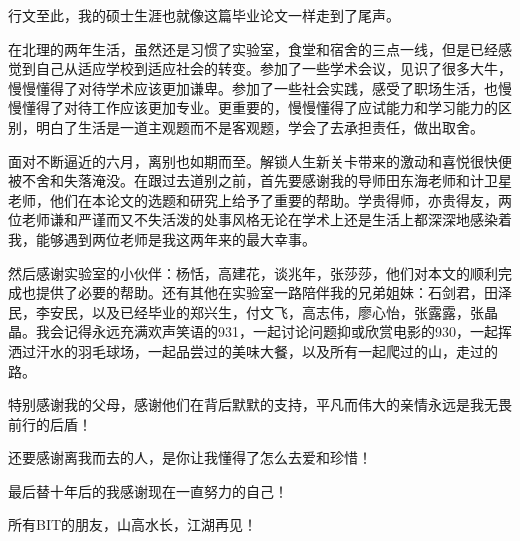 
\begin{thanks}
行文至此，我的硕士生涯也就像这篇毕业论文一样走到了尾声。

在北理的两年生活，虽然还是习惯了实验室，食堂和宿舍的三点一线，但是已经感觉到自己从适应学校到适应社会的转变。参加了一些学术会议，见识了很多大牛，慢慢懂得了对待学术应该更加谦卑。参加了一些社会实践，感受了职场生活，也慢慢懂得了对待工作应该更加专业。更重要的，慢慢懂得了应试能力和学习能力的区别，明白了生活是一道主观题而不是客观题，学会了去承担责任，做出取舍。

面对不断逼近的六月，离别也如期而至。解锁人生新关卡带来的激动和喜悦很快便被不舍和失落淹没。在跟过去道别之前，首先要感谢我的导师田东海老师和计卫星老师，他们在本论文的选题和研究上给予了重要的帮助。学贵得师，亦贵得友，两位老师谦和严谨而又不失活泼的处事风格无论在学术上还是生活上都深深地感染着我，能够遇到两位老师是我这两年来的最大幸事。

然后感谢实验室的小伙伴：杨恬，高建花，谈兆年，张莎莎，他们对本文的顺利完成也提供了必要的帮助。还有其他在实验室一路陪伴我的兄弟姐妹：石剑君，田泽民，李安民，以及已经毕业的郑兴生，付文飞，高志伟，廖心怡，张露露，张晶晶。我会记得永远充满欢声笑语的931，一起讨论问题抑或欣赏电影的930，一起挥洒过汗水的羽毛球场，一起品尝过的美味大餐，以及所有一起爬过的山，走过的路。

特别感谢我的父母，感谢他们在背后默默的支持，平凡而伟大的亲情永远是我无畏前行的后盾！

还要感谢离我而去的人，是你让我懂得了怎么去爱和珍惜！

最后替十年后的我感谢现在一直努力的自己！

所有BIT的朋友，山高水长，江湖再见！








\end{thanks}
